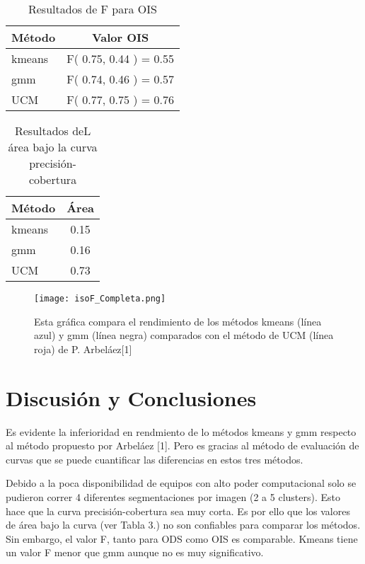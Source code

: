 \documentclass[10pt,twocolumn,letterpaper]{article}
\begin{document}
\begin{table}
\begin{center}
\begin{tabular}{|l|c|}
\hline
Método & Valor OIS \\
\hline\hline
kmeans & F( 0.75, 0.44 ) = 0.55\\
gmm & F( 0.74, 0.46 ) = 0.57  \\
UCM & F( 0.77, 0.75 ) = 0.76\\
\hline
\end{tabular}
\end{center}
\caption{Resultados de F para OIS}
\end{table}

\begin{table}
\begin{center}
\begin{tabular}{|l|c|}
\hline
Método & Área \\
\hline\hline
kmeans & 0.15\\
gmm & 0.16  \\
UCM & 0.73\\
\hline
\end{tabular}
\end{center}
\caption{Resultados deL área bajo la curva precisión-cobertura}
\end{table}

\begin{figure}[h]
\begin{center}

   \texttt{[image: isoF\_Completa.png]}
\end{center}
   \caption{Esta gráfica compara el rendimiento de los métodos kmeans (línea azul) y gmm (línea negra) comparados con el método de UCM (línea roja) de P. Arbeláez[1]}
\label{fig:long}
\label{fig:onecol}
\end{figure}

\section{Discusión y Conclusiones}

Es evidente la inferioridad en rendmiento de lo métodos kmeans y gmm respecto al método propuesto por Arbeláez [1]. Pero es gracias al método de evaluación de curvas que se puede cuantificar las diferencias en estos tres métodos.

Debido a la poca disponibilidad de equipos con alto poder computacional solo se pudieron correr 4 diferentes segmentaciones por imagen (2 a 5 clusters). Esto hace que la curva precisión-cobertura sea muy corta. Es por ello que los valores de área bajo la curva (ver Tabla 3.) no son confiables para comparar los métodos. Sin embargo, el valor F, tanto para ODS como OIS es comparable. Kmeans tiene un valor F menor que gmm aunque no es muy significativo. 
\end{document}
